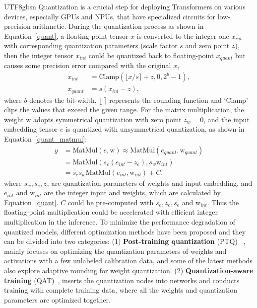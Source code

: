 \documentclass[10pt,journal,compsoc]{IEEEtran}
\newcommand{\<}{\left\langle}
\renewcommand{\>}{\right\rangle}
\newcommand{\1}{\mathbbm{1}}
\begin{document}
\begin{CJK}{UTF8}{gbsn}
Quantization is a crucial step for deploying  Transformers on various devices, especially GPUs and NPUs, that have specialized circuits for low-precision arithmetic. During the quantization process as shown in Equation~\ref{quant}, a floating-point tensor $x$ is converted to the integer one $x_{int}$ with corresponding quantization parameters (scale factor $s$ and zero point $z$), then the integer tensor $x_{int}$ could be quantized back to floating-point $x_{quant}$ but causes some precision error compared with the original $x$, 
\begin{equation}
	\begin{aligned}
		x_{int}  & = \textrm{Clamp}(\lfloor x/s \rceil +z, 0, 2^b-1), \\
		x_{quant} & = s(x_{int}-z),
		\label{quant}
	\end{aligned}
\end{equation}
where $b$ denotes the bit-width, $\lfloor \cdot \rceil$ represents the rounding function and `Clamp' clips the values that exceed the given range. For the matrix multiplication, the weight $\textrm{w}$ adopts symmetrical quantization with zero point $z_w=0$, and the input embedding tensor $e$ is quantized with unsymmetrical quantization, as shown in Equation~\ref{quant_matmul}:
\begin{equation}
	\begin{aligned}
		y & = \textrm{MatMul}(e, \textrm{w}) \approx \textrm{MatMul}(e_{quant}, \textrm{w}_{quant}) \\
		& = \textrm{MatMul}(s_e(e_{int}-z_e), s_w \textrm{w}_{int}) \\
		& = s_es_w\textrm{MatMul}(e_{int}, \textrm{w}_{int}) + C,
		\label{quant_matmul}
	\end{aligned}
\end{equation}
where $s_w, s_e, z_e$ are quantization parameters of weights and input embedding, and $e_{int}$ and $\textrm{w}_{int}$ are the integer input and weights, which are calculated by Equation~\ref{quant}. $C$ could be pre-computed with $s_e, z_e, s_e$ and $\textrm{w}_{int}$. Thus the floating-point multiplication could be accelerated with efficient integer multiplication in the inference. To minimize the performance degradation of quantized models, different optimization methods have been proposed and they can be divided into two categories: (1) \textbf{Post-training quantization} (PTQ)~\cite{liu2021post, yuan2022ptq4vit,lin2021fq,ding2022towards,lit2022auto, liu2023noisyquant, li2023repq} ,  mainly focuses on optimizing the quantization parameters of weights and activations with a few unlabeled calibration data, and some of the latest methods also explore adaptive rounding for weight quantization. (2) \textbf{Quantization-aware training} (QAT)~\cite{wang2022quantformer,li2022q,li2022q_diff, chen2023data, li2023vit, frumkin2023jumping, liu2023oscillation, xiao2023patch, li2022patch, li2023psaq, xu2023q, huang2023variation},  inserts the quantization nodes into networks and conducts training with complete training data, where all the weights and quantization parameters are optimized together. 

\end{CJK}
\end{document}

